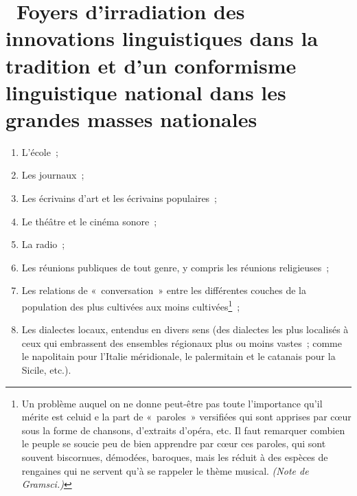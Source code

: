 \documentclass[french,twoside]{book} %
\begin{document}
\section[{ Foyers d’irradiation des innovations linguistiques dans la tradition et d’un conformisme linguistique national dans les grandes masses nationales}]{ Foyers d’irradiation des innovations linguistiques dans la tradition et d’un conformisme linguistique national dans les grandes masses nationales}

\begin{enumerate}[itemsep=0pt,]
\item L'école ;
\item Les journaux ;
\item Les écrivains d’art et les écrivains populaires ;
\item Le théâtre et le cinéma sonore ;
\item La radio ;
\item Les réunions publiques de tout genre, y compris les réunions religieuses ;
\item Les relations de « conversation » entre les différentes couches de la population des plus cultivées aux moins cultivées\footnote{Un problème auquel on ne donne peut-être pas toute l’importance qu’il mérite est celuid e la part de « paroles » versifiées qui sont apprises par cœur sous la forme de chansons, d’extraits d’opéra, etc. Il faut remarquer combien le peuple se soucie peu de bien apprendre par cœur ces paroles, qui sont souvent biscornues, démodées, baroques, mais les réduit à des espèces de rengaines qui ne servent qu’à se rappeler le thème musical. \emph{(Note de Gramsci.)}} ;
\item Les dialectes locaux, entendus en divers sens (des dialectes les plus localisés à ceux qui embrassent des ensembles régionaux plus ou moins vastes ; comme le napolitain pour l’Italie méridionale, le palermitain et le catanais pour la Sicile, etc.).
\end{enumerate}
\end{document}

